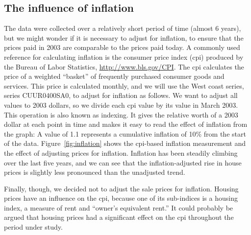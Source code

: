 \documentclass[oneside]{article}
\begin{document}
\subsection{The influence of inflation}

The data were collected over a relatively short period of time (almost 6 years), but we might wonder if it is necessary to adjust for inflation, to ensure that the prices paid in 2003 are comparable to the prices paid today.  A commonly used reference for calculating inflation is the consumer price index ({\sc cpi}) produced by the Bureau of Labor Statistics, \url{http://www.bls.gov/CPI}.  The {\sc cpi} calculates the price of a weighted ``basket'' of frequently purchased consumer goods and services.  This price is calculated monthly, and we will use the West coast series, series CUUR0400SA0, to adjust for inflation as follows.  We want to adjust all values to 2003 dollars, so we divide each {\sc cpi} value by its value in March 2003.  This operation is also known as indexing.  It gives the relative worth of a 2003 dollar at each point in time and makes it easy to read the effect of inflation from the graph: A value of 1.1 represents a cumulative inflation of 10\% from the start of the data.  
Figure~\ref{fig:inflation} shows the {\sc cpi}-based inflation measurement and the effect of adjusting prices for inflation.  Inflation has been steadily climbing over the last five years, and we can see that the inflation-adjusted rise in house prices is slightly less pronounced than the unadjusted trend. 

Finally, though, we decided not to adjust the sale prices for inflation. Housing prices have an influence on the {\sc cpi}, because one of its sub-indices is a housing index, a measure of rent and ``owner's equivalent rent.''  It could probably be argued that housing prices had a significant effect on the {\sc cpi} throughout the period under study.
\end{document}
